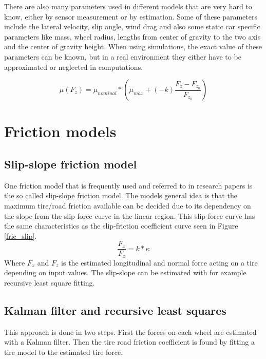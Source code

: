 There are also many parameters used in different models that are very hard to know, either by sensor measurement or by estimation. Some of these parameters include the lateral velocity, slip angle, wind drag and also some static car specific parameters like mass, wheel radius, lengths from center of gravity to the two axis and the center of gravity height. When using simulations, the exact value of these parameters can be known, but in a real environment they either have to be approximated or neglected in computations. 

\begin{equation}
\mu(F_{z})=\mu_{nominal}*(\mu_{max} + (-k)\frac{F_{z} - F_{z_{0}}}{F_{z_{0}}})
\end{equation}

\section{Friction models}

\subsection{Slip-slope friction model}

One friction model that is frequently used and referred to in research papers is the so called slip-slope friction model. The models general idea is that the maximum tire/road friction available can be decided due to its dependency on the slope from the slip-force curve in the linear region. This slip-force curve has the same characteristics as the slip-friction coefficient curve seen in Figure \ref{fric_slip}. 
\begin{equation}
	\dfrac{F_{x}}{F_{z}} = k*\kappa
\end{equation}
Where $ F_{x} $ and $ F_{z} $ is the estimated longitudinal and normal force acting on a tire depending on input values. The slip-slope can be estimated with for example recursive least square fitting.


\subsection{Kalman filter and recursive least squares}
This approach is done in two steps. First the forces on each wheel are estimated with a Kalman filter. Then the tire road friction coefficient is found by fitting a tire model to the estimated tire force.